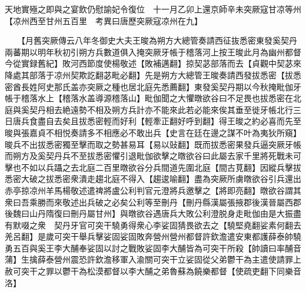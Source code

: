 天地實殛之即與之宴飲仍慰諭妃令復位　十一月乙卯上還京師辛未突厥寇甘凉等州【凉州西至甘州五百里　考異曰唐歷突厥寇凉州在九】

　　【月舊突厥傳云八年冬御史大夫王晙為朔方大總管奏請西征抜悉密東發奚契丹兩蕃期以明年秋初引朔方兵數道俱入掩突厥牙帳于稽落河上按王晙此月為幽州都督今從實録舊紀】敗河西節度使楊敬述【敗補邁翻】掠契苾部落而去【貞觀中契苾來降處其部落于凉州契欺訖翻苾毗必翻】先是朔方大總管王晙奏請西發拔悉密【拔悉密酋長姓阿史那氏盖亦突厥之種也居北庭先悉薦翻】東發奚契丹期以今秋掩毗伽牙帳于稽落水上【稽落水盖導源稽落山】毗伽聞之大懼暾欲谷曰不足畏也拔悉密在北庭與奚契丹相去絶遠勢不相及朔方兵計亦不能來此若必能來俟其垂至徙牙帳北行三日唐兵食盡自去矣且拔悉密輕而好利【輕牽正翻好呼到翻】得王晙之約必喜而先至晙與張嘉貞不相悦奏請多不相應必不敢出兵【史言在廷在邊之謀不叶為夷狄所窺】晙兵不出拔悉密獨至擊而取之勢甚易耳【易以䜴翻】既而拔悉密果發兵逼突厥牙帳而朔方及奚契丹兵不至拔悉密懼引退毗伽欲擊之暾欲谷曰此屬去家千里將死戰未可擊也不如以兵躡之去北庭二百里暾欲谷分兵間道先圍北庭【間古莧翻】因縱兵擊拔悉密大破之拔悉密衆潰走趨北庭不得入【趨逡喻翻】盡為突厥所虜暾欲谷引兵還出赤亭掠凉州羊馬楊敬述遣禆將盧公利判官元澄將兵邀擊之【將即亮翻】暾欲谷謂其衆曰吾乘勝而來敬述出兵破之必矣公利等至刪丹【刪丹縣漢屬張掖郡後漢晉屬西郡後魏曰山丹隋復曰刪丹屬甘州】與暾欲谷遇唐兵大敗公利澄脱身走毗伽由是大振盡有默啜之衆　契丹牙官可突干驍勇得衆心李娑固猜畏欲去之【驍堅堯翻娑素何翻去羌呂翻】是歲可突干舉兵擊娑固娑固敗奔營州營州都督許欽澹遣安東都護薛泰帥驍勇五百與奚王李大酺奉娑固以討之戰敗娑固李大酺皆為可突干所殺【帥讀曰率酺音蒲】生擒薛泰營州震恐許欽澹移軍入渝關可突干立娑固從父弟鬱干為主遣使請罪上赦可突干之罪以鬱干為松漠都督以李大酺之弟魯蘇為饒樂都督【使疏吏翻下同樂音洛】

